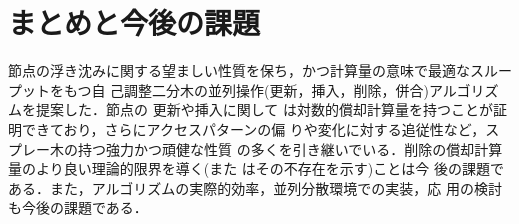 \section{まとめと今後の課題}

節点の浮き沈みに関する望ましい性質を保ち，かつ計算量の意味で最適なスルー
プットをもつ自
己調整二分木の並列操作(更新，挿入，削除，併合)アルゴリズムを提案した．節点の
更新や挿入に関して
は対数的償却計算量を持つことが証明できており，さらにアクセスパターンの偏
りや変化に対する追従性など，スプレー木の持つ強力かつ頑健な性質
の多くを引き継いでいる．削除の償却計算量のより良い理論的限界を導く(また
はその不存在を示す)ことは今
後の課題である．また，アルゴリズムの実際的効率，並列分散環境での実装，応
用の検討も今後の課題である．

